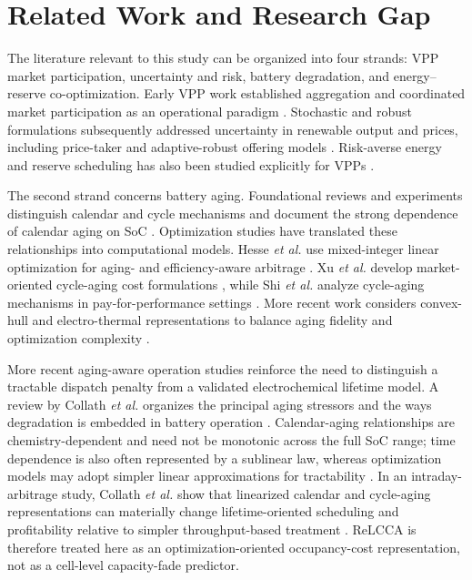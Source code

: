 \documentclass[journal,12pt,twocolumn]{IEEEtran}
\begin{document}
\section{Related Work and Research Gap}
\label{sec:related}

The literature relevant to this study can be organized into four strands: VPP market participation, uncertainty and risk, battery degradation, and energy--reserve co-optimization. Early VPP work established aggregation and coordinated market participation as an operational paradigm \cite{Pudjianto2007,Pandzic2013,Giuntoli2013}. Stochastic and robust formulations subsequently addressed uncertainty in renewable output and prices, including price-taker and adaptive-robust offering models \cite{Conejo2010,Baringo2017,Baringo2016,Mujeeb2025}. Risk-averse energy and reserve scheduling has also been studied explicitly for VPPs \cite{Vahedipour2021}.

The second strand concerns battery aging. Foundational reviews and experiments distinguish calendar and cycle mechanisms and document the strong dependence of calendar aging on SoC \cite{Vetter2005,Broussely2005,Barre2013,Keil2016,Schmalstieg2014,Naumann2018}. Optimization studies have translated these relationships into computational models. Hesse \emph{et al.} use mixed-integer linear optimization for aging- and efficiency-aware arbitrage \cite{Hesse2019}. Xu \emph{et al.} develop market-oriented cycle-aging cost formulations \cite{Xu2018a,Xu2018b}, while Shi \emph{et al.} analyze cycle-aging mechanisms in pay-for-performance settings \cite{Shi2019}. More recent work considers convex-hull and electro-thermal representations to balance aging fidelity and optimization complexity \cite{Petrin2025,Kumtepeli2020}.

More recent aging-aware operation studies reinforce the need to distinguish a tractable dispatch penalty from a validated electrochemical lifetime model. A review by Collath \emph{et al.} organizes the principal aging stressors and the ways degradation is embedded in battery operation \cite{Collath2022}. Calendar-aging relationships are chemistry-dependent and need not be monotonic across the full SoC range; time dependence is also often represented by a sublinear law, whereas optimization models may adopt simpler linear approximations for tractability \cite{Keil2016,Naumann2018,Collath2022}. In an intraday-arbitrage study, Collath \emph{et al.} show that linearized calendar and cycle-aging representations can materially change lifetime-oriented scheduling and profitability relative to simpler throughput-based treatment \cite{Collath2023}. ReLCCA is therefore treated here as an optimization-oriented occupancy-cost representation, not as a cell-level capacity-fade predictor.
\end{document}
